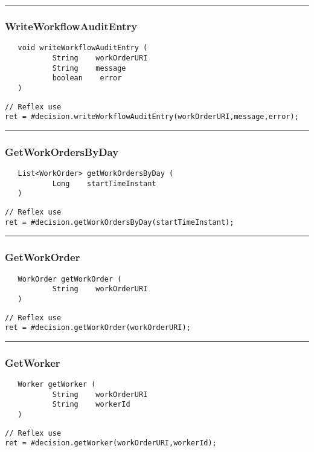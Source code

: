 \rule{15cm}{2pt}
\subsubsection{WriteWorkflowAuditEntry}
\label{Api:WriteWorkflowAuditEntry}
\begin{verbatim}
   void writeWorkflowAuditEntry (
           String    workOrderURI
           String    message
           boolean    error
   )
\end{verbatim}
\begin{lstlisting}[language=reflex]
// Reflex use
ret = #decision.writeWorkflowAuditEntry(workOrderURI,message,error);
\end{lstlisting}



\rule{15cm}{2pt}
\subsubsection{GetWorkOrdersByDay}
\label{Api:GetWorkOrdersByDay}
\begin{verbatim}
   List<WorkOrder> getWorkOrdersByDay (
           Long    startTimeInstant
   )
\end{verbatim}
\begin{lstlisting}[language=reflex]
// Reflex use
ret = #decision.getWorkOrdersByDay(startTimeInstant);
\end{lstlisting}



\rule{15cm}{2pt}
\subsubsection{GetWorkOrder}
\label{Api:GetWorkOrder}
\begin{verbatim}
   WorkOrder getWorkOrder (
           String    workOrderURI
   )
\end{verbatim}
\begin{lstlisting}[language=reflex]
// Reflex use
ret = #decision.getWorkOrder(workOrderURI);
\end{lstlisting}



\rule{15cm}{2pt}
\subsubsection{GetWorker}
\label{Api:GetWorker}
\begin{verbatim}
   Worker getWorker (
           String    workOrderURI
           String    workerId
   )
\end{verbatim}
\begin{lstlisting}[language=reflex]
// Reflex use
ret = #decision.getWorker(workOrderURI,workerId);
\end{lstlisting}



